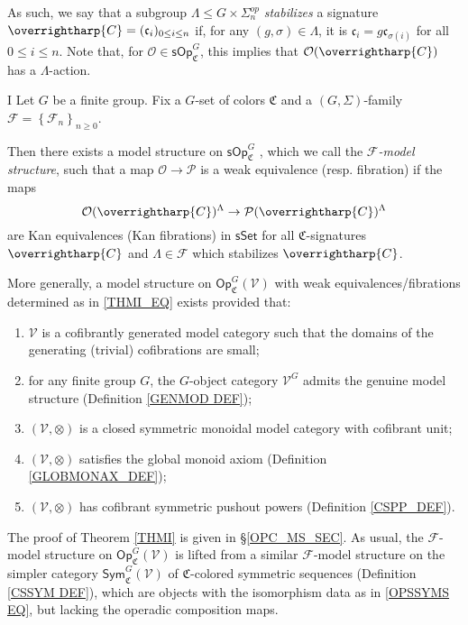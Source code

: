 \documentclass[a4paper,10pt
,draft
]{article}%
\numberwithin{equation}{section}
\numberwithin{figure}{section}
\theoremstyle{definition} %
\newcommand{\set}[1]{\left\{#1\right\}}%
\newcommand{\vect}[1]{\text{\overrightharp{\ensuremath{#1}}}}
\newcommand{\Op}{\mathsf{Op}}%
\newcommand{\F}{\ensuremath{\mathcal F}}
\newcommand{\V}{\ensuremath{\mathcal V}}
\renewcommand{\O}{\ensuremath{\mathcal O}}
\newcommand{\1}{\ensuremath{\mathbbm 1}}%
\begin{document}
As such, we say that a subgroup 
$\Lambda \leq G \times \Sigma_n^{op}$
\emph{stabilizes} a signature $\vect{C}=(\mathfrak{c}_i)_{0 \leq i \leq n}$ if,
for any $(g,\sigma) \in \Lambda$,
it is 
$\mathfrak{c}_i = g \mathfrak{c}_{\sigma(i)}$ for all $0 \leq i \leq n$.
Note that,
for $\O \in \mathsf{sOp}^G_{\mathfrak{C}}$,
this implies that $\O(\vect{C})$ has a $\Lambda$-action.




\begin{customthm}{I}\label{THMI}
Let $G$ be a finite group. Fix a $G$-set of colors $\mathfrak{C}$
and a $(G,\Sigma)$-family $\F = \set{\F_n}_{n \geq 0}$.

Then there exists a model structure on
$\mathsf{sOp}^G_{\mathfrak{C}}$ ,
which we call the \emph{$\mathcal{F}$-model structure},
such that a map
$\mathcal{O} \to \mathcal{P}$
is a weak equivalence (resp. fibration) if the maps
\begin{equation}\label{THMI_EQ}
	\O(\vect{C})^{\Lambda} \to \mathcal{P}(\vect{C})^{\Lambda}
\end{equation}
are Kan equivalences (Kan fibrations)
in $\mathsf{sSet}$
for all $\mathfrak{C}$-signatures $\vect{C}$
and $\Lambda \in \F$ which stabilizes $\vect{C}$.

More generally, a model structure on 
$\Op^G_{\mathfrak C}(\V)$
with weak equivalences/fibrations determined as in 
\eqref{THMI_EQ}
exists provided that:
\begin{enumerate}[label = (\roman*)]
	\item $\V$ is a cofibrantly generated model category
	such that the domains of the generating (trivial) cofibrations are small;
	\item for any finite group $G$, the $G$-object category $\V^G$ admits the genuine model structure (Definition \ref{GENMOD DEF});
	\item $(\V, \otimes)$ is a closed symmetric monoidal model category with cofibrant unit;
	\item $(\V, \otimes)$ satisfies the global monoid axiom (Definition \ref{GLOBMONAX_DEF});
	\item $(\V, \otimes)$ has cofibrant symmetric pushout powers (Definition \ref{CSPP_DEF}).
\end{enumerate}
\end{customthm}


The proof of Theorem \ref{THMI} is given in \S \ref{OPC_MS_SEC}.
As usual, the $\F$-model structure on 
$\Op^G_{\mathfrak C}(\V)$ is lifted from 
a similar $\F$-model structure on the simpler category
$\mathsf{Sym}^G_{\mathfrak C}(\V)$
of $\mathfrak{C}$-colored symmetric sequences
(Definition \ref{CSSYM DEF}),
which are objects with the isomorphism data as in 
\eqref{OPSSYMS EQ}, 
but lacking the operadic composition maps.
\end{document}
